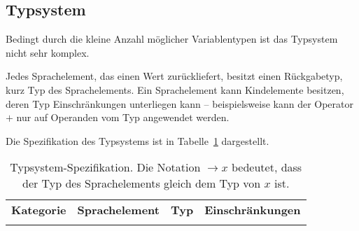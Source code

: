 \subsection{Typsystem}

Bedingt durch die kleine Anzahl möglicher Variablentypen ist das Typsystem nicht sehr komplex.

Jedes Sprachelement, das einen Wert zurückliefert, besitzt einen Rückgabetyp, kurz Typ des Sprachelements. Ein Sprachelement kann Kindelemente besitzen, deren Typ Einschränkungen unterliegen kann -- beispielsweise kann der Operator $+$ nur auf Operanden vom Typ \int{} angewendet werden.

Die Spezifikation des Typsystems ist in Tabelle~\ref{typesystem} dargestellt.

\begin{landscape}

\enlargethispage{.2cm}

\begin{longtable}{lllp{11cm}}
\label{typesystem} \\
\caption{Typsystem-Spezifikation. Die Notation $\rightarrow x$ bedeutet, dass der Typ des Sprachelements gleich dem Typ von $x$ ist.} \\
\toprule
\textbf{Kategorie} & \textbf{Sprachelement} & \textbf{Typ} & \textbf{Einschränkungen} \\
\midrule

\endhead

\endfoot


\end{longtable}
\end{landscape}
